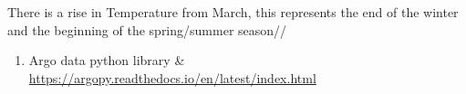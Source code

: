 \documentclass[20pt]{report}
\begin{document}
There is a rise in Temperature from March, this represents the end of the winter and the beginning of the spring/summer season//





\begin{enumerate}
\item Argo data python library &  \url{ https://argopy.readthedocs.io/en/latest/index.html}
\end{enumerate}

\end{document}
